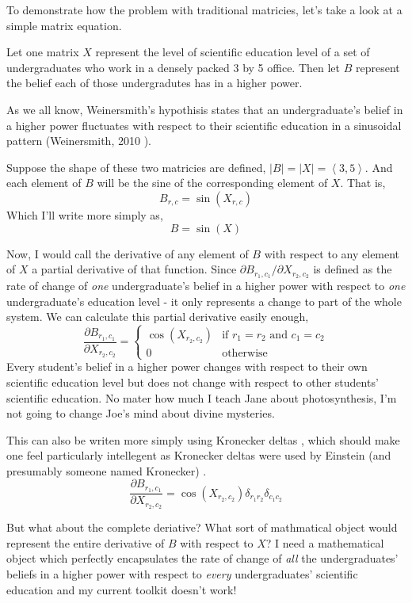 \documentclass[12pt]{book}
\theoremstyle{plain}
\theoremstyle{definition}
\theoremstyle{ppart}
\theoremstyle{case}
\theoremstyle{solution}
\newcommand{\shape}[1]{\left|#1\right|}
\begin{document}
To demonstrate how the problem with traditional matricies, let's take a look at a
simple matrix equation. 

Let one matrix $X$ represent the level of scientific education level of a set of
undergraduates who work in a densely packed 3 by 5 office.
Then let $B$ represent the belief each of those undergradutes has in a higher power.

As we all know, Weinersmith's hypothisis states that an undergraduate's belief in a
higher power fluctuates with respect to their scientific education in a sinusoidal
pattern (Weinersmith, 2010 \cite{weinersmith:education}).

Suppose the shape of these two matricies are defined,
$\shape{B} = \shape{X} = \left< 3,5 \right>$.
And each element of $B$ will be the sine of the corresponding element of
$X$. That is, \[B_{r,c} = \sin(X_{r,c})\]
Which I'll write more simply as, \[B = \sin(X)\]

Now, I would call the derivative of any element of $B$ with respect to any element
of $X$ a partial derivative of that function. Since
$\partial B_{r_1, c_1}/\partial X_{r_2, c_2}$ is defined as the rate of change of
\textit{one} undergraduate's belief in a higher power with respect to \textit{one}
undergraduate's education level - it only represents a change to part of the whole
system. 
We can calculate this partial derivative easily enough,
\[
\frac{\partial B_{r_1,c_1}}{\partial X_{r_2,c_2}} = 
\left\{
  \begin{array}{ll}
    \cos(X_{r_2,c_2})  & \mbox{if } r_1 = r_2 \mbox{ and } c_1 = c_2 \\
    0 & \mbox{otherwise}
  \end{array}
\right.
\]
Every student's belief in a higher power changes with respect to their own
scientific education level but does not change with respect to other students'
scientific education. No mater how much I teach Jane about photosynthesis, I'm
not going to change Joe's mind about divine mysteries.

This can also be writen more simply using Kronecker deltas \cite{wiki:kronecker},
which should make one feel particularly intellegent as Kronecker deltas were used
by Einstein (and presumably someone named Kronecker) \cite{wiki:einstein}.
\[
\frac{\partial B_{r_1,c_1}}{\partial X_{r_2,c_2}} = 
\cos (X_{r_2, c_2}) \delta_{r_1 r_2} \delta_{c_1 c_2}
\]

But what about the complete deriative?
What sort of mathmatical object would represent the entire derivative
of $B$ with respect to $X$?
I need a mathematical object which perfectly
encapsulates the rate of change of \textit{all} the undergraduates' beliefs in a
higher power with respect to \textit{every} undergraduates' scientific education
and my current toolkit doesn't work!
\end{document}
